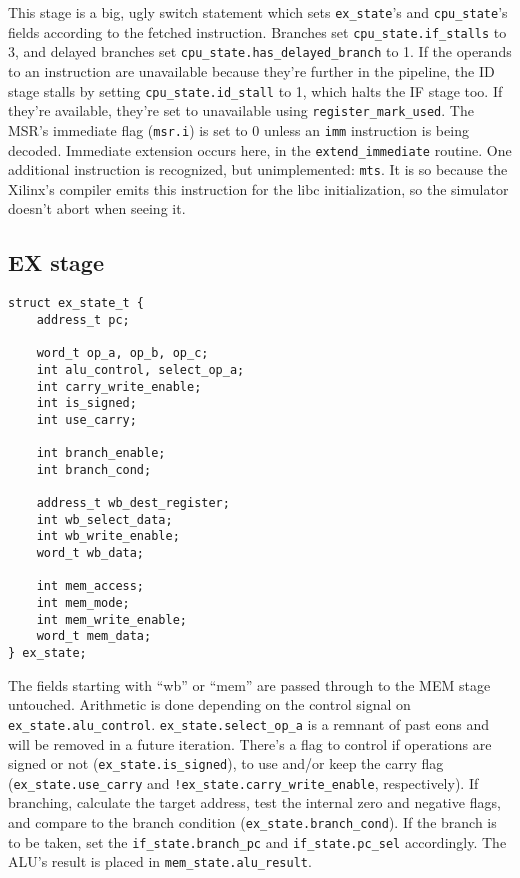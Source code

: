 \documentclass[]{IEEEtran}
\begin{document}
This stage is a big, ugly switch statement which sets \verb|ex_state|'s and
\verb|cpu_state|'s fields according to the fetched instruction. Branches set
\verb|cpu_state.if_stalls| to 3, and delayed branches set
\verb|cpu_state.has_delayed_branch| to 1. If the operands to an instruction are
unavailable because they're further in the pipeline, the ID stage stalls by
setting \verb|cpu_state.id_stall| to 1, which halts the IF stage too. If they're
available, they're set to unavailable using \verb|register_mark_used|. The MSR's
immediate flag (\verb|msr.i|) is set to 0 unless an \verb|imm| instruction is
being decoded. Immediate extension occurs here, in the \verb|extend_immediate|
routine. One additional instruction is recognized, but unimplemented: \verb|mts|.
It is so because the Xilinx's compiler emits this instruction for the libc
initialization, so the simulator doesn't abort when seeing it.


\subsection{EX stage}

\begin{verbatim}
struct ex_state_t {
    address_t pc;

    word_t op_a, op_b, op_c;
    int alu_control, select_op_a;
    int carry_write_enable;
    int is_signed;
    int use_carry;

    int branch_enable;
    int branch_cond;

    address_t wb_dest_register;
    int wb_select_data;
    int wb_write_enable;
    word_t wb_data;

    int mem_access;
    int mem_mode;
    int mem_write_enable;
    word_t mem_data;
} ex_state;
\end{verbatim}

The fields starting with ``wb'' or ``mem'' are passed through to the MEM stage
untouched. Arithmetic is done depending on the control signal on
\verb|ex_state.alu_control|. \verb|ex_state.select_op_a| is a remnant of past
eons and will be removed in a future iteration. There's a flag to control if
operations are signed or not (\verb|ex_state.is_signed|), to use and/or keep the
carry flag (\verb|ex_state.use_carry| and \verb|!ex_state.carry_write_enable|,
respectively). If branching, calculate the target address, test the internal
zero and negative flags, and compare to the branch condition
(\verb|ex_state.branch_cond|). If the branch is to be taken, set the
\verb|if_state.branch_pc| and \verb|if_state.pc_sel| accordingly. The ALU's
result is placed in \verb|mem_state.alu_result|.
\end{document}
